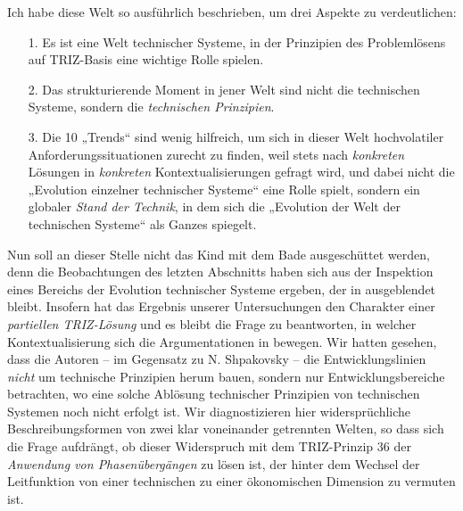 \documentclass[11pt,a4paper]{article}
\begin{document}
Ich habe diese Welt so ausführlich beschrieben, um drei Aspekte zu
verdeutlichen:
\begin{itemize}
\item [1.] Es ist eine Welt technischer Systeme, in der Prinzipien des
  Problemlösens auf TRIZ-Basis eine wichtige Rolle spielen.
\item [2.] Das strukturierende Moment in jener Welt sind nicht die technischen
  Systeme, sondern die \emph{technischen Prinzipien}.
\item [3.] Die 10 „Trends“ sind wenig hilfreich, um sich in dieser Welt
  hochvolatiler Anforderungssituationen zurecht zu finden, weil stets nach
  \emph{konkreten} Lösungen in \emph{konkreten} Kontextualisierungen gefragt
  wird, und dabei nicht die „Evolution einzelner technischer Systeme“ eine
  Rolle spielt, sondern ein globaler \emph{Stand der Technik}, in dem sich die
  „Evolution der Welt der technischen Systeme“ als Ganzes spiegelt. 
\end{itemize}

Nun soll an dieser Stelle nicht das Kind mit dem Bade ausgeschüttet werden,
denn die Beobachtungen des letzten Abschnitts haben sich aus der Inspektion
eines Bereichs der Evolution technischer Systeme ergeben, der in
\cite{TESE2018} ausgeblendet bleibt.  Insofern hat das Ergebnis unserer
Untersuchungen den Charakter einer \emph{partiellen TRIZ-Lösung} und es bleibt
die Frage zu beantworten, in welcher Kontextualisierung sich die
Argumentationen in \cite{TESE2018} bewegen. Wir hatten gesehen, dass die
Autoren -- im Gegensatz zu N. Shpakovsky \cite{Shpakovsky2010} -- die
Entwicklungslinien \emph{nicht} um technische Prinzipien herum bauen, sondern
nur Entwicklungsbereiche betrachten, wo eine solche Ablösung technischer
Prinzipien von technischen Systemen noch nicht erfolgt ist.  Wir
diagnostizieren hier widersprüchliche Beschreibungsformen von zwei klar
voneinander getrennten Welten, so dass sich die Frage aufdrängt, ob dieser
Widerspruch mit dem TRIZ-Prinzip 36 der \emph{Anwendung von Phasenübergängen}
zu lösen ist, der hinter dem Wechsel der Leitfunktion von einer technischen zu
einer ökonomischen Dimension zu vermuten ist.
\end{document}
